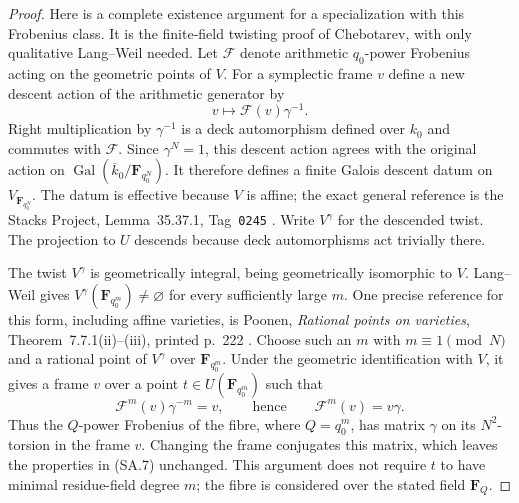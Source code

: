\documentclass[11pt,a4paper]{article}
\begin{document}
\begin{proof}
Here is a complete existence argument for a specialization
with this Frobenius class.  It is the finite-field
twisting proof of Chebotarev, with only qualitative
Lang--Weil needed.  Let $\mathcal F$ denote arithmetic
$q_0$-power Frobenius acting on the geometric points of
$V$.  For a symplectic frame $v$ define a new descent
action of the arithmetic generator by
\[
                       v\longmapsto
                               \mathcal F(v)\gamma^{-1}.
                                                               \tag{SA.8}
\]
Right multiplication by $\gamma^{-1}$ is a deck
automorphism defined over $k_0$ and commutes with
$\mathcal F$.  Since $\gamma^N=1$, this descent action
agrees with the original action on
$\operatorname{Gal}(\overline{k}_0/\mathbf F_{q_0^N})$.
It therefore defines a finite Galois descent datum on
$V_{\mathbf F_{q_0^N}}$.  The datum is effective because
$V$ is affine; the exact general reference is the
Stacks Project, Lemma~35.37.1, Tag~\texttt{0245}
\cite{Stacks0245}.
Write $V^\gamma$ for the descended twist.
The projection to $U$ descends because deck
automorphisms act trivially there.

The twist $V^\gamma$ is geometrically integral, being
geometrically isomorphic to $V$.  Lang--Weil gives
$V^\gamma(\mathbf F_{q_0^m})\ne\varnothing$ for every
sufficiently large $m$.  One precise reference for this
form, including affine varieties, is Poonen,
\emph{Rational points on varieties}, Theorem~7.7.1(ii)--(iii),
printed p.~222 \cite{Poonen2017RPV}.  Choose such an $m$
with $m\equiv1\pmod N$ and a rational point of
$V^\gamma$ over $\mathbf F_{q_0^m}$.  Under the geometric
identification with $V$, it gives a frame $v$ over a
point $t\in U(\mathbf F_{q_0^m})$ such that
\[
                \mathcal F^m(v)\gamma^{-m}=v,
       \qquad\text{hence}\qquad
                \mathcal F^m(v)=v\gamma.                      \tag{SA.9}
\]
Thus the $Q$-power Frobenius of the fibre, where
$Q=q_0^m$, has matrix $\gamma$ on its $N^2$-torsion in
the frame $v$.  Changing the frame conjugates this
matrix, which leaves the properties in (SA.7) unchanged.
This argument does not require $t$ to have minimal
residue-field degree $m$; the fibre is considered over
the stated field $\mathbf F_Q$.


\end{proof}
\end{document}
